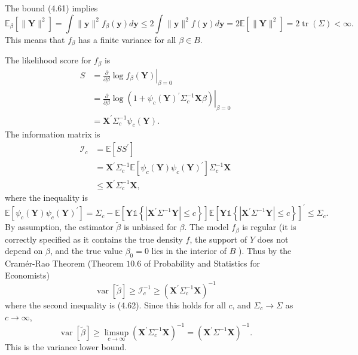 \documentclass[10pt]{article}
\begin{document}
The bound (4.61) implies
$$
\mathbb{E}_{\beta}\left[\|\boldsymbol{Y}\|^{2}\right]=\int\|\boldsymbol{y}\|^{2} f_{\beta}(\boldsymbol{y}) d \boldsymbol{y} \leq 2 \int\|\boldsymbol{y}\|^{2} f(\boldsymbol{y}) d \boldsymbol{y}=2 \mathbb{E}\left[\|\boldsymbol{Y}\|^{2}\right]=2 \operatorname{tr}(\Sigma)<\infty .
$$
This means that $f_{\beta}$ has a finite variance for all $\beta \in B$.

The likelihood score for $f_{\beta}$ is
$$
\begin{aligned}
S &=\left.\frac{\partial}{\partial \beta} \log f_{\beta}(\boldsymbol{Y})\right|_{\beta=0} \\
&=\left.\frac{\partial}{\partial \beta} \log \left(1+\psi_{c}(\boldsymbol{Y})^{\prime} \Sigma_{c}^{-1} \boldsymbol{X} \beta\right)\right|_{\beta=0} \\
&=\boldsymbol{X}^{\prime} \Sigma_{c}^{-1} \psi_{c}(\boldsymbol{Y}) .
\end{aligned}
$$
The information matrix is
$$
\begin{aligned}
\mathscr{I}_{c} &=\mathbb{E}\left[S S^{\prime}\right] \\
&=\boldsymbol{X}^{\prime} \Sigma_{c}^{-1} \mathbb{E}\left[\psi_{c}(\boldsymbol{Y}) \psi_{c}(\boldsymbol{Y})^{\prime}\right] \Sigma_{c}^{-1} \boldsymbol{X} \\
& \leq \boldsymbol{X}^{\prime} \Sigma_{c}^{-1} \boldsymbol{X},
\end{aligned}
$$
where the inequality is
$$
\mathbb{E}\left[\psi_{c}(\boldsymbol{Y}) \psi_{c}(\boldsymbol{Y})^{\prime}\right]=\Sigma_{c}-\mathbb{E}\left[\boldsymbol{Y} \mathbb{1}\left\{\left|\boldsymbol{X}^{\prime} \Sigma^{-1} \boldsymbol{Y}\right| \leq c\right\}\right] \mathbb{E}\left[\boldsymbol{Y} \mathbb{1}\left\{\left|\boldsymbol{X}^{\prime} \Sigma^{-1} \boldsymbol{Y}\right| \leq c\right\}\right]^{\prime} \leq \Sigma_{c} .
$$
By assumption, the estimator $\widetilde{\beta}$ is unbiased for $\beta$. The model $f_{\beta}$ is regular (it is correctly specified as it contains the true density $f$, the support of $Y$ does not depend on $\beta$, and the true value $\beta_{0}=0$ lies in the interior of $B$ ). Thus by the Cramér-Rao Theorem (Theorem $10.6$ of Probability and Statistics for Economists)
$$
\operatorname{var}[\widetilde{\beta}] \geq \mathscr{I}_{c}^{-1} \geq\left(\boldsymbol{X}^{\prime} \Sigma_{c}^{-1} \boldsymbol{X}\right)^{-1}
$$
where the second inequality is (4.62). Since this holds for all $c$, and $\Sigma_{c} \rightarrow \Sigma$ as $c \rightarrow \infty$,
$$
\operatorname{var}[\widetilde{\beta}] \geq \limsup _{c \rightarrow \infty}\left(\boldsymbol{X}^{\prime} \Sigma_{c}^{-1} \boldsymbol{X}\right)^{-1}=\left(\boldsymbol{X}^{\prime} \Sigma^{-1} \boldsymbol{X}\right)^{-1} .
$$
This is the variance lower bound.
\end{document}
